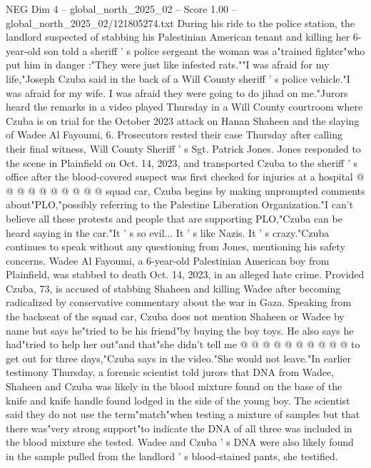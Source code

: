 \begin{textsample}{NEG Dim 4 – global\_north\_2025\_02 – Score 1.00 – global\_north\_2025\_02/121805274.txt}  \label{ex:f4_neg_406}
During his ride to the police station, the landlord suspected of stabbing his Palestinian American tenant and killing her 6-year-old son told a sheriff ' s police sergeant the woman was a"trained fighter"who put him in danger :"They were just like infested rats.""I was afraid for my life,"Joseph Czuba said in the back of a Will County sheriff ' s police vehicle."I was afraid for my wife.
I was afraid they were going to do jihad on me."Jurors heard the remarks in a video played Thursday in a Will County courtroom where Czuba is on trial for the October 2023 attack on Hanan Shaheen and the slaying of Wadee Al Fayoumi, 6.
Prosecutors rested their case Thursday after calling their final witness, Will County Sheriff ' s Sgt.
Patrick Jones.
Jones responded to the scene in Plainfield on Oct. 14, 2023, and transported Czuba to the sheriff ' s office after the blood-covered suspect was first checked for injuries at a hospital @ @ @ @ @ @ @ @ @ @ squad car, Czuba begins by making unprompted comments about"PLO,"possibly referring to the Palestine Liberation Organization."I can't believe all these protests and people that are supporting PLO,"Czuba can be heard saying in the car."It ' s so evil...
It ' s like Nazis.
It ' s crazy."Czuba continues to speak without any questioning from Jones, mentioning his safety concerns.
Wadee Al Fayoumi, a 6-year-old Palestinian American boy from Plainfield, was stabbed to death Oct. 14, 2023, in an alleged hate crime.
Provided Czuba, 73, is accused of stabbing Shaheen and killing Wadee after becoming radicalized by conservative commentary about the war in Gaza.
Speaking from the backseat of the squad car, Czuba does not mention Shaheen or Wadee by name but says he"tried to be his friend"by buying the boy toys.
He also says he had"tried to help her out"and that"she didn't tell me @ @ @ @ @ @ @ @ @ @ to get out for three days,"Czuba says in the video."She would not leave."In earlier testimony Thursday, a forensic scientist told jurors that DNA from Wadee, Shaheen and Czuba was likely in the blood mixture found on the base of the knife and knife handle found lodged in the side of the young boy.
The scientist said they do not use the term"match"when testing a mixture of samples but that there was"very strong support"to indicate the DNA of all three was included in the blood mixture she tested.
Wadee and Czuba ' s DNA were also likely found in the sample pulled from the landlord ' s blood-stained pants, she testified.

\end{textsample}
